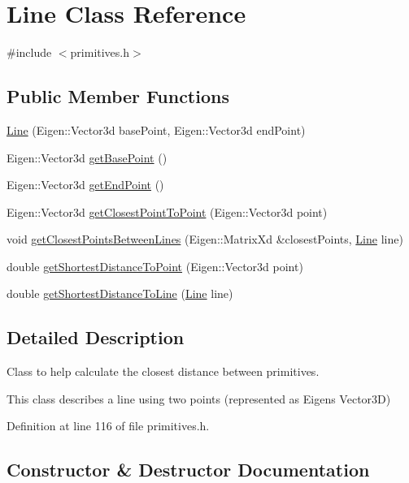 \hypertarget{class_line}{}\section{Line Class Reference}
\label{class_line}


{\ttfamily \#include $<$primitives.\+h$>$}

\subsection*{Public Member Functions}
\begin{DoxyCompactItemize}
\item 
\hyperlink{class_line_acb2738366446296860a14644c11a93cd}{Line} (Eigen\+::\+Vector3d base\+Point, Eigen\+::\+Vector3d end\+Point)
\item 
Eigen\+::\+Vector3d \hyperlink{class_line_a649b65b3ddb9702ad3800a76ad8ca274}{get\+Base\+Point} ()
\item 
Eigen\+::\+Vector3d \hyperlink{class_line_a227b3d61216a37b32b856a56be6761a7}{get\+End\+Point} ()
\item 
Eigen\+::\+Vector3d \hyperlink{class_line_a920e0d93c96f3fcf85acb301d920063e}{get\+Closest\+Point\+To\+Point} (Eigen\+::\+Vector3d point)
\item 
void \hyperlink{class_line_a61228b3629e0f8b204c60a6d337bb546}{get\+Closest\+Points\+Between\+Lines} (Eigen\+::\+Matrix\+Xd \&closest\+Points, \hyperlink{class_line}{Line} line)
\item 
double \hyperlink{class_line_af874e592b4b8a7db37b0a6d8feb5cf3f}{get\+Shortest\+Distance\+To\+Point} (Eigen\+::\+Vector3d point)
\item 
double \hyperlink{class_line_a4097eed5d653a46fe18b760c67a53a37}{get\+Shortest\+Distance\+To\+Line} (\hyperlink{class_line}{Line} line)
\end{DoxyCompactItemize}


\subsection{Detailed Description}
Class to help calculate the closest distance between primitives.

This class describes a line using two points (represented as Eigen\textquotesingle{}s Vector3D) 

Definition at line 116 of file primitives.\+h.



\subsection{Constructor \& Destructor Documentation}
